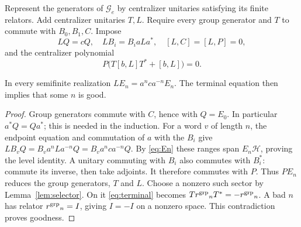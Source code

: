 Represent the generators of $\mathcal G_e$ by centralizer unitaries satisfying its finite relators. Add centralizer unitaries $T,L$. Require every group generator and $T$ to commute with $B_0,B_1,C$. Impose
\begin{equation}\label{eq:reader19}
 LQ=cQ,\quad LB_i=B_i aLa^*,\quad [L,C]=[L,P]=0,
\end{equation}
and the centralizer polynomial
\begin{equation}\label{eq:terminal}
 P\bigl(T[b,L]T^*+[b,L]\bigr)=0.
\end{equation}
\begin{lemma}\label{lem:reader}
In every semifinite realization $LE_n=a^nca^{-n}E_n$. The terminal equation then implies that some $n$ is good.
\end{lemma}
\begin{proof}
Group generators commute with $C$, hence with $Q=E_0$. In particular $a^*Q=Qa^*$; this is needed in the induction. For a word $v$ of length $n$, the endpoint equation and commutation of $a$ with the $B_i$ give $LB_vQ=B_v a^nLa^{-n}Q=B_va^nca^{-n}Q$. By \eqref{eq:En} these ranges span $E_n\mathcal H$, proving the level identity. A unitary commuting with $B_i$ also commutes with $B_i^*$: commute its inverse, then take adjoints. It therefore commutes with $P$. Thus $PE_n$ reduces the group generators, $T$ and $L$. Choose a nonzero such sector by Lemma~\ref{lem:selector}. On it \eqref{eq:terminal} becomes $T{r^{\rm grp}}_nT^*=-{r^{\rm grp}}_n$. A bad $n$ has relator ${r^{\rm grp}}_n=I$, giving $I=-I$ on a nonzero space. This contradiction proves goodness.
\end{proof}

